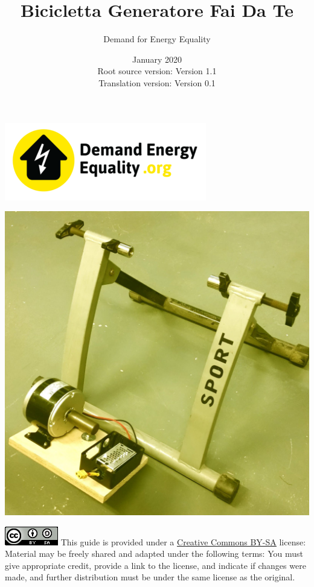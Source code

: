 \documentclass{article}
\title{Bicicletta Generatore Fai Da Te}
\author{Demand for Energy Equality}
\date{January 2020 \\ Root source version: Version 1.1 \\ Translation version: Version 0.1}
\theoremstyle{definition}
\theoremstyle{definition}
\theoremstyle{remark}
\begin{document}
 
\maketitle{}

\begin{center}
  \includegraphics[width=0.25\paperwidth]{../Images/image_0_0_(demand_energy_equality).png}
\end{center}

\begin{center}
  \includegraphics[width=0.45\paperwidth]{../Images/image_0_1_(bike).png}
\end{center}

\vfill
  
\includegraphics[]{../Images/image_0_2_(license).png} \newline
This guide is provided under a \href{https://creativecommons.org/licenses/by-sa/4.0/legalcode}{\underline{Creative Commons BY-SA}} license: \newline
Material may be freely shared and adapted under the following terms: You must give appropriate credit, provide a link to the license, and indicate if changes were made, and further distribution must be under the same license as the original.
\end{document}
